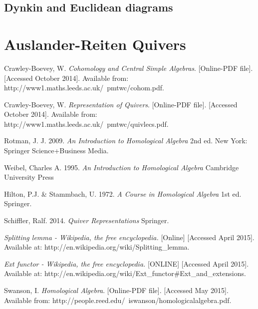 \documentclass[11.5pt, twoside, a4paper, titlepage]{report}
\theoremstyle{definition}
\theoremstyle{plain}
\begin{document}
\section{Dynkin and Euclidean diagrams}


\chapter{Auslander-Reiten Quivers}














\begin{thebibliography}{99}

Crawley-Boevey, W.
\emph{Cohomology and Central Simple Algebras}. [Online-PDF file]. [Accessed October 2014].
Available from: http://www1.maths.leeds.ac.uk/~pmtwc/cohom.pdf.

Crawley-Boevey, W.
\emph{Representation of Quivers}. [Online-PDF file]. [Accessed October 2014].
Available from: http://www1.maths.leeds.ac.uk/~pmtwc/quivlecs.pdf.

Rotman, J. J.
2009.
\emph{An Introduction to Homological Algebra}
2nd ed.
New York: Springer Science+Business Media.

Weibel, Charles A.
1995.
\emph{An Introduction to Homological Algebra}
Cambridge University Press

Hilton, P.J. \& Stammbach, U.
1972.
\emph{A Course in Homological Algebra}
1st ed.
Springer.

Schiffler, Ralf.
2014.
\emph{Quiver Representations}
Springer.

\emph{Splitting lemma - Wikipedia, the free encyclopedia.} [Online]  [Accessed April 2015].
Available at: http://en.wikipedia.org/wiki/Splitting\_lemma.

\emph{Ext functor - Wikipedia, the free encyclopedia.} [ONLINE]  [Accessed April 2015].
Available at: http://en.wikipedia.org/wiki/Ext\_functor\#Ext\_and\_extensions.

Swanson, I.
\emph{Homological Algebra}. [Online-PDF file]. [Accessed May 2015].
Available from: http://people.reed.edu/~iswanson/homologicalalgebra.pdf.

\end{thebibliography}
\end{document}
